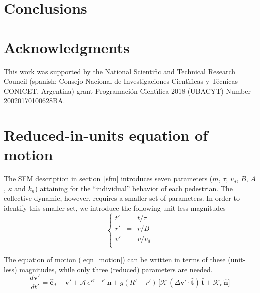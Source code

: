 \documentclass[preprint,12pt]{elsarticle}
\begin{document}
\section{\label{conclusions}Conclusions}

\section*{Acknowledgments}
This work was supported by the National Scientific and Technical 
Research Council (spanish: Consejo Nacional de Investigaciones Cient\'\i ficas 
y T\'ecnicas - CONICET, Argentina) grant Programaci\'on Cient\'\i fica 2018 (UBACYT) Number 20020170100628BA.

\appendix

\section{\label{appendix1}Reduced-in-units equation of motion}

The SFM description in section~\ref{sfm} introduces seven parameters ($m$, 
$\tau$, $v_d$, $B$, $A$, $\kappa$ and $k_n$) attaining for the ``individual'' 
behavior of each pedestrian. The collective dynamic, however, requires a 
smaller set of parameters. In order to identify this smaller set, we introduce 
the following unit-less magnitudes\\

\begin{equation}
 \left\{\begin{array}{lcl}
         t' & = & t/\tau \\
         r' & = & r/B \\
         v' & = & v/v_d \\
        \end{array}\right.
\end{equation}

The equation of motion (\ref{eqn_motion}) can be written in terms of these 
(unit-less) magnitudes, while only three (reduced) parameters are needed.\\


\begin{equation}
 \displaystyle\frac{d\mathbf{v}'}{dt'}=
 \hat{\mathbf{e}}_d-\mathbf{v}'+\mathcal{A}\,e^{R'-r'}\,
 \hat{\mathbf{n}}+g(R'-r')\,\bigg[\mathcal{K}\,(\Delta\mathbf{v}'\cdot
 \hat{\mathbf{t}})\,\hat{\mathbf{t}}+\mathcal{K}_c\,\hat{\mathbf{n}}\bigg]
\end{equation}
\end{document}
